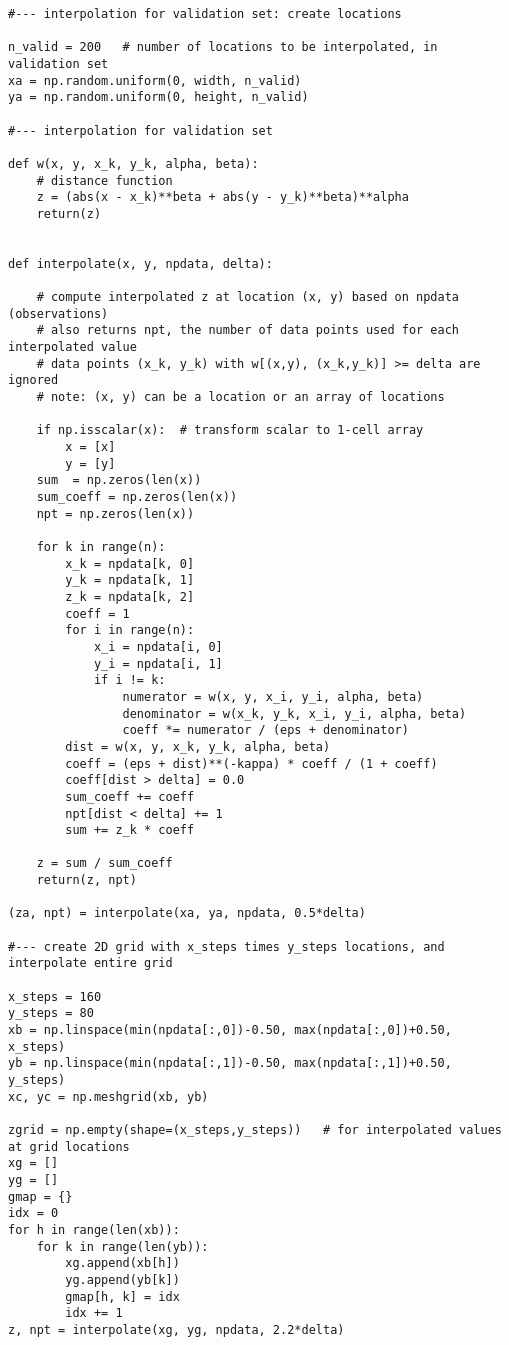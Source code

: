 \documentclass[oneside,10pt]{book}
\begin{document}
\begin{lstlisting}
#--- interpolation for validation set: create locations

n_valid = 200   # number of locations to be interpolated, in validation set
xa = np.random.uniform(0, width, n_valid)
ya = np.random.uniform(0, height, n_valid)

#--- interpolation for validation set 

def w(x, y, x_k, y_k, alpha, beta):
    # distance function
    z = (abs(x - x_k)**beta + abs(y - y_k)**beta)**alpha
    return(z)


def interpolate(x, y, npdata, delta):

    # compute interpolated z at location (x, y) based on npdata (observations)
    # also returns npt, the number of data points used for each interpolated value
    # data points (x_k, y_k) with w[(x,y), (x_k,y_k)] >= delta are ignored
    # note: (x, y) can be a location or an array of locations

    if np.isscalar(x):  # transform scalar to 1-cell array
        x = [x]
        y = [y]
    sum  = np.zeros(len(x))
    sum_coeff = np.zeros(len(x)) 
    npt = np.zeros(len(x)) 
    
    for k in range(n):
        x_k = npdata[k, 0]
        y_k = npdata[k, 1]
        z_k = npdata[k, 2]
        coeff = 1
        for i in range(n):
            x_i = npdata[i, 0]
            y_i = npdata[i, 1]
            if i != k:
                numerator = w(x, y, x_i, y_i, alpha, beta)
                denominator = w(x_k, y_k, x_i, y_i, alpha, beta) 
                coeff *= numerator / (eps + denominator) 
        dist = w(x, y, x_k, y_k, alpha, beta)   
        coeff = (eps + dist)**(-kappa) * coeff / (1 + coeff) 
        coeff[dist > delta] = 0.0  
        sum_coeff += coeff
        npt[dist < delta] += 1   
        sum += z_k * coeff  
 
    z = sum / sum_coeff 
    return(z, npt)

(za, npt) = interpolate(xa, ya, npdata, 0.5*delta)

#--- create 2D grid with x_steps times y_steps locations, and interpolate entire grid 

x_steps = 160  
y_steps = 80 
xb = np.linspace(min(npdata[:,0])-0.50, max(npdata[:,0])+0.50, x_steps)
yb = np.linspace(min(npdata[:,1])-0.50, max(npdata[:,1])+0.50, y_steps)
xc, yc = np.meshgrid(xb, yb) 

zgrid = np.empty(shape=(x_steps,y_steps))   # for interpolated values at grid locations
xg = []
yg = []
gmap = {}
idx = 0
for h in range(len(xb)):
    for k in range(len(yb)):
        xg.append(xb[h])
        yg.append(yb[k])
        gmap[h, k] = idx
        idx += 1 
z, npt = interpolate(xg, yg, npdata, 2.2*delta)


\end{lstlisting}
\end{document}
